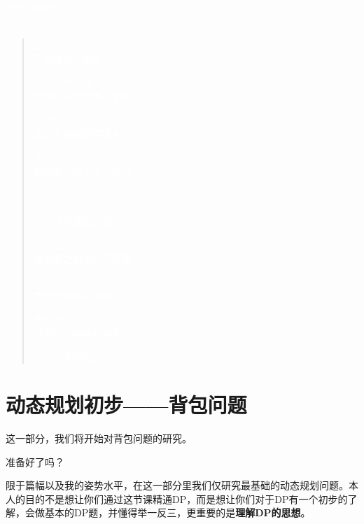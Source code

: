 \documentclass{article}
\theoremstyle{nonumberplain}
\begin{document}
\section*{\textcolor{white}{?????}}
\begin{quote}
	\textcolor{white}{ ニレ\\
		千本樱溶入夜中}

	\textcolor{white}{ノモカナイヨ\\
		连你的声音也传不到啊}

	\textcolor{white}{は の\\
		此处开宴钢铁牢笼中}

	\textcolor{white}{そのでろして\\
		自那断头台上往下看吧}

	\ \\

	\textcolor{white}{　\\
		三千世界黄泉之暗}

	\textcolor{white}{クモコエナイヨ\\
		连哀叹之歌也听不见啊}

	\textcolor{white}{の　かかなた\\
		青蓝天空遥远彼端}

	\textcolor{white}{そのでいて\\
		就用那光线枪射穿吧}

	\begin{flushright}\textcolor{white}{------「千本桜」}\end{flushright}
\end{quote}
\newpage
\section{动态规划初步------背包问题}
这一部分，我们将开始对背包问题的研究。

准备好了吗？

限于篇幅以及我的姿势水平，在这一部分里我们仅研究最基础的动态规划问题。本人的目的不是想让你们通过这节课精通DP，而是想让你们对于DP有一个初步的了解，会做基本的DP题，并懂得举一反三，更重要的是\textbf{理解DP的思想}。
\end{document}

